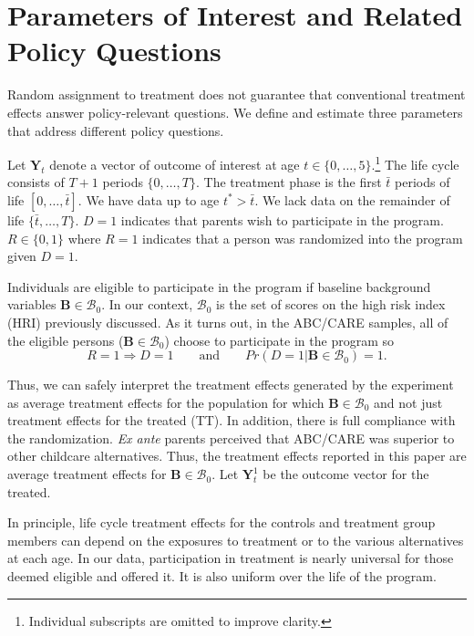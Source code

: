 \section{Parameters of Interest and Related Policy Questions} \label{section:methodsquestions}

Random assignment to treatment does not guarantee that conventional treatment effects answer policy-relevant questions. We define and estimate three parameters that address different policy questions.

Let $\bm{Y}_t$ denote a vector of outcome of interest at age $t \in \{ 0,\dots,5 \}$.\footnote{Individual subscripts are omitted to improve clarity.} The life cycle consists of $T+1$ periods $\{0,\dots,T\}$. The treatment phase is the first $\bar{t}$ periods of life $\left[0,\dots,\bar{t}\right]$. We have data up to age $t^{*}>\bar{t}$. We lack data on the remainder of life $\{\bar{t},\dots,T\}$. $D=1$ indicates that parents wish to participate in the program. $R \in \{0,1\}$ where $R=1$ indicates that a person was randomized into the program given $D=1$.

Individuals are eligible to participate in the program if baseline background variables $\bm{B}\in\mathcal{B}_0$. In our context, $\mathcal{B}_0$ is the set of scores on the high risk index (HRI) previously discussed. As it turns out, in the ABC/CARE samples, all of the eligible persons ($\bm{B}\in\mathcal{B}_0$) choose to participate in the program so
\begin{equation}
R=1 \Rightarrow D=1 \qquad \text{and} \qquad Pr(D=1 | \bm{B} \in \mathcal{B}_0) = 1.
\end{equation}

Thus, we can safely interpret the treatment effects generated by the experiment as average treatment effects for the population for which $\bm{B}\in\mathcal{B}_0$ and not just treatment effects for the treated (TT). In addition, there is full compliance with the randomization. \emph{Ex ante} parents perceived that ABC/CARE was superior to other childcare alternatives. Thus, the treatment effects reported in this paper are average treatment effects for $\bm{B}\in\mathcal{B}_0$. Let $\bm{Y}^1_t$ be the outcome vector for the treated.

In principle, life cycle treatment effects for the controls and treatment group members can depend on the exposures to treatment or to the various alternatives at each age. In our data, participation in treatment is nearly universal for those deemed eligible and offered it. It is also uniform over the life of the program.

